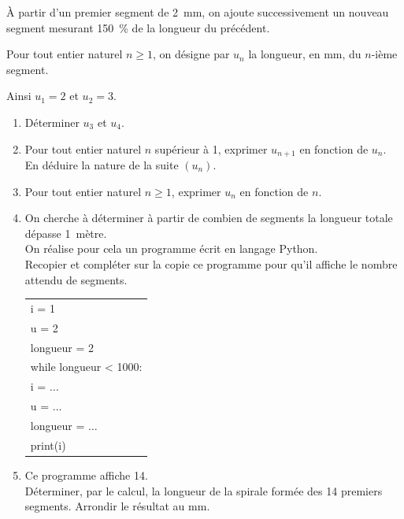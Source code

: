 \medskip
À partir d'un premier segment de \qty{2}{\mm}, on ajoute successivement un nouveau segment mesurant \qty{150}{\percent}
de la longueur du précédent.

Pour tout entier naturel $n\geqslant1$, on désigne par $u_n$ la longueur, en mm, du $n$-ième segment.

Ainsi $u_1=2$ et $u_2=3$.
\begin{enumerate}
\item Déterminer $u_3$ et $u_4$.
\item Pour tout entier naturel $n$ supérieur à 1, exprimer $u_{n+1}$ en fonction de $u_n$.\\
En déduire la nature de la suite $(u_n)$.
\item Pour tout entier naturel $n\geqslant1$, exprimer $u_n$ en fonction de $n$.
\item On cherche à déterminer à partir de combien de segments la longueur totale dépasse 1~mètre.\hspace*{-8.5pt}\\
On réalise pour cela un programme écrit en langage \textsf{Python}.\\
Recopier et compléter sur la copie ce programme pour qu'il affiche le nombre attendu de segments.

\begin{center}
\begin{tabular}[]{|l|}
\hline
i = 1\\
u = 2\\
longueur = 2\\
while longueur < 1000:\\
\hspace{1.3em}	i = $\dots$\\
\hspace{1.3em}	u = $\dots$\\
\hspace{1.3em}	longueur = $\dots$\\
print(i)\\
\hline
\end{tabular}
\end{center}

\item Ce programme affiche 14.\\
Déterminer, par le calcul, la longueur de la spirale formée des 14 premiers segments. Arrondir le
résultat au mm.
\end{enumerate}

\medskip
